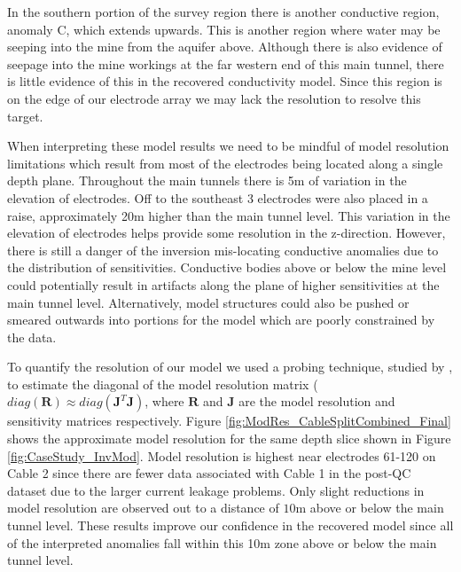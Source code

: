 \documentclass[final,authoryear,5p,times,twocolumn]{elsarticle}
\begin{document}
In the southern portion of the survey region there is another conductive region, anomaly C, which extends upwards. This is another region where water may be seeping into the mine from the aquifer above. Although there is also evidence of seepage into the mine workings at the far western end of this main tunnel, there is little evidence of this in the recovered conductivity model. Since this region is on the edge of our electrode array we may lack the resolution to resolve this target.

When interpreting these model results we need to be mindful of model resolution limitations which result from most of the electrodes being located along a single depth plane. Throughout the main tunnels there is 5m of variation in the elevation of electrodes. Off to the southeast 3 electrodes were also placed in a raise, approximately 20m higher than the main tunnel level. This variation in the elevation of electrodes helps provide some resolution in the z-direction. However, there is still a danger of the inversion mis-locating conductive anomalies due to the distribution of sensitivities. Conductive bodies above or below the mine level could potentially result in artifacts along the plane of higher sensitivities at the main tunnel level. Alternatively, model structures could also be pushed or smeared outwards into portions for the model which are poorly constrained by the data.

To quantify the resolution of our model we used a probing technique, studied by \cite{Bekas2007}, to estimate the diagonal of the model resolution matrix ($diag(\mathbf{R}) \approx diag(\mathbf{J}^{T}\mathbf{J})$, where $\mathbf{R}$ and $\mathbf{J}$ are the model resolution and sensitivity matrices respectively. Figure \ref{fig:ModRes_CableSplitCombined_Final} shows the approximate model resolution for the same depth slice shown in Figure \ref{fig:CaseStudy_InvMod}. Model resolution is highest near electrodes 61-120 on Cable 2 since there are fewer data associated with Cable 1 in the post-QC dataset due to the larger current leakage problems. Only slight reductions in model resolution are observed out to a distance of $10$m above or below the main tunnel level. These results improve our confidence in the recovered model since all of the interpreted anomalies fall within this 10m zone above or below the main tunnel level.
\end{document}
